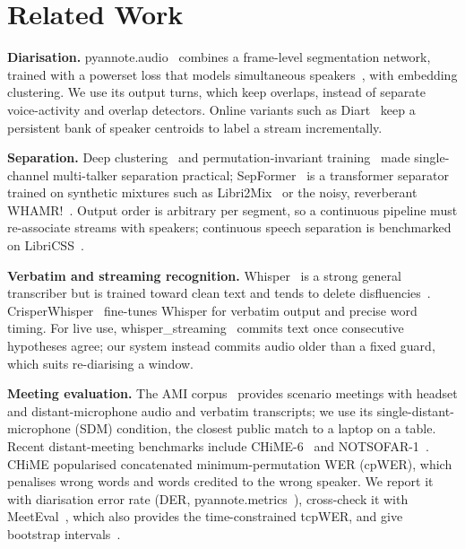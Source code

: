 \documentclass[conference]{IEEEtran}
\begin{document}
\section{Related Work}
\textbf{Diarisation.} pyannote.audio~\cite{bredin2023pyannote} combines a frame-level segmentation network, trained with a powerset loss that models simultaneous speakers~\cite{plaquet2023powerset}, with embedding clustering. We use its output turns, which keep overlaps, instead of separate voice-activity and overlap detectors. Online variants such as Diart~\cite{coria2021diart} keep a persistent bank of speaker centroids to label a stream incrementally.

\textbf{Separation.} Deep clustering~\cite{hershey2016deepclustering} and permutation-invariant training~\cite{kolbaek2017upit} made single-channel multi-talker separation practical; SepFormer~\cite{subakan2021sepformer} is a transformer separator trained on synthetic mixtures such as Libri2Mix~\cite{cosentino2020librimix} or the noisy, reverberant WHAMR!~\cite{maciejewski2020whamr}. Output order is arbitrary per segment, so a continuous pipeline must re-associate streams with speakers; continuous speech separation is benchmarked on LibriCSS~\cite{chen2020libricss}.

\textbf{Verbatim and streaming recognition.} Whisper~\cite{radford2023whisper} is a strong general transcriber but is trained toward clean text and tends to delete disfluencies~\cite{shriberg1994disfluency}. CrisperWhisper~\cite{zusag2024crisperwhisper} fine-tunes Whisper for verbatim output and precise word timing. For live use, whisper\_streaming~\cite{machacek2023whisperstreaming} commits text once consecutive hypotheses agree; our system instead commits audio older than a fixed guard, which suits re-diarising a window.

\textbf{Meeting evaluation.} The AMI corpus~\cite{carletta2005ami} provides scenario meetings with headset and distant-microphone audio and verbatim transcripts; we use its single-distant-microphone (SDM) condition, the closest public match to a laptop on a table. Recent distant-meeting benchmarks include CHiME-6~\cite{watanabe2020chime6} and NOTSOFAR-1~\cite{vinnikov2024notsofar}. CHiME popularised concatenated minimum-permutation WER (cpWER), which penalises wrong words and words credited to the wrong speaker. We report it with diarisation error rate (DER, pyannote.metrics~\cite{bredin2017metrics}), cross-check it with MeetEval~\cite{vonneumann2023meeteval}, which also provides the time-constrained tcpWER, and give bootstrap intervals~\cite{bisani2004bootstrap}.
\end{document}
